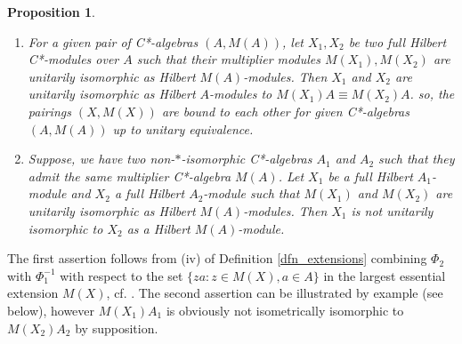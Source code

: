 \documentclass{amsart}
\newtheorem{prop}[thm]{Proposition}
\theoremstyle{definition}
\begin{document}
\begin{prop} $\,$
\begin{enumerate}
  \item For a given pair of C*-algebras $(A,M(A))$, let $X_1,X_2$ be two full Hilbert C*-modules over $A$ such that their multiplier modules $M(X_1),M(X_2)$ are unitarily isomorphic as Hilbert $M(A)$-modules. Then $X_1$ and $X_2$ are unitarily isomorphic as Hilbert $A$-modules to $M(X_1)A \equiv M(X_2)A$. so, the pairings $(X, M(X))$ are bound to each other for given C*-algebras $(A,M(A))$ up to unitary equivalence.
  \item Suppose, we have two non-$*$-isomorphic C*-algebras $A_1$ and $A_2$ such that they admit the same multiplier C*-algebra $M(A)$. Let $X_1$ be a full Hilbert $A_1$-module and $X_2$ a full Hilbert $A_2$-module such that $M(X_1)$ and $M(X_2)$ are unitarily isomorphic as Hilbert $M(A)$-modules. Then $X_1$ is not unitarily isomorphic to $X_2$ as a Hilbert $M(A)$-module. 
\end{enumerate}
\end{prop}

The first assertion follows from (iv) of Definition \ref{dfn_extensions} combining  $\Phi_2$ with $\Phi_1^{-1}$ with respect to the set $\{ za : z \in M(X), a \in A \}$ in the largest essential extension $M(X)$, cf. \cite[Prop.~1.4]{RT2002}. The second assertion can be illustrated by example (see below), however $M(X_1)A_1$ is obviously not isometrically isomorphic to $M(X_2)A_2$ by supposition.
\end{document}
